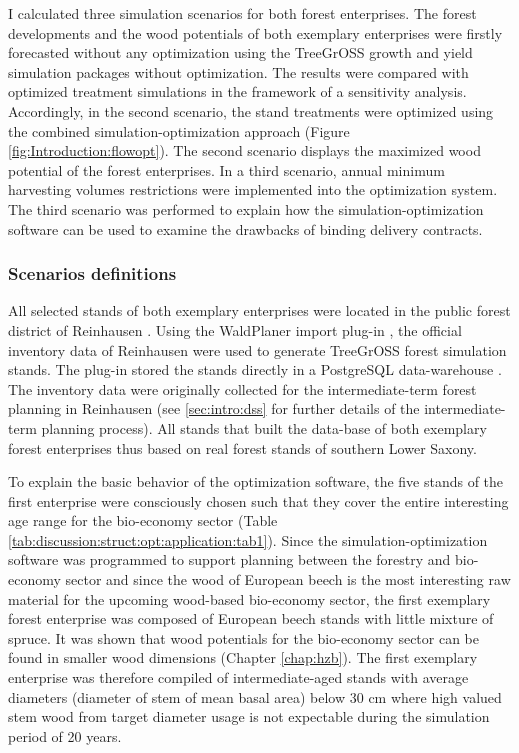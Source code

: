 I calculated three simulation scenarios for both forest enterprises. The forest developments and the wood potentials of both exemplary enterprises were firstly forecasted without any optimization using the TreeGrOSS growth and yield simulation packages without optimization. The results were compared with optimized treatment simulations in the framework of a sensitivity analysis. Accordingly, in the second scenario, the stand treatments were optimized using the combined simulation-optimization approach (Figure \ref{fig:Introduction:flowopt}). The second scenario displays the maximized wood potential of the forest enterprises. In a third scenario, annual minimum harvesting volumes restrictions were implemented into the optimization system. The third scenario was performed to explain how the si\-mu\-la\-tion-op\-ti\-mi\-za\-tion software can be used to examine the drawbacks of binding delivery contracts.

\subsubsection{Scenarios definitions}
\label{subsubsec:discussion:struct:opt:application:method}
All selected stands of both exemplary enterprises were located in the public forest district of Reinhausen \citep{nlf_2017}. Using the WaldPlaner import plug-in \citep[p. 58]{hansen_2014}, the official inventory data of Reinhausen were used to generate TreeGrOSS forest simulation stands. The plug-in stored the stands directly in a PostgreSQL data-warehouse \citep{eisentraut_2003}. The inventory data were originally collected for the intermediate-term forest planning in Reinhausen (see \ref{sec:intro:dss} for further details of the intermediate-term planning process). All stands that built the data-base of both exemplary forest enterprises thus based on real forest stands of southern Lower Saxony.

To explain the basic behavior of the optimization software, the five stands of the first enterprise were consciously chosen such that they cover the entire interesting age range for the bio-economy sector (Table \ref{tab:discussion:struct:opt:application:tab1}). Since the simulation-optimization software was programmed to support planning between the forestry and bio-economy sector and since the wood of European beech is the most interesting raw material for the upcoming wood-based bio-economy sector, the first exemplary forest enterprise was composed of European beech stands with little mixture of spruce. It was shown that wood potentials for the bio-economy sector can be found in smaller wood dimensions (Chapter \ref{chap:hzb}). The first exemplary enterprise was therefore compiled of intermediate-aged stands with average diameters (diameter of stem of mean basal area) below 30 cm where high valued stem wood from target diameter usage is not expectable during the simulation period of 20 years.

